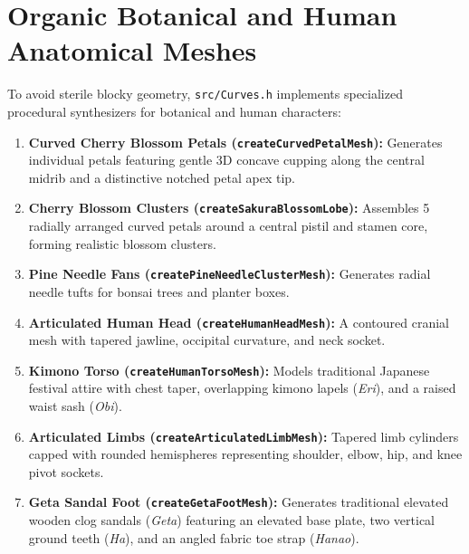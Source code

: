 \section{Organic Botanical and Human Anatomical Meshes}
To avoid sterile blocky geometry, \texttt{src/Curves.h} implements specialized procedural synthesizers for botanical and human characters:
\begin{enumerate}
    \item \textbf{Curved Cherry Blossom Petals (\texttt{createCurvedPetalMesh}):} Generates individual petals featuring gentle 3D concave cupping along the central midrib and a distinctive notched petal apex tip.
    \item \textbf{Cherry Blossom Clusters (\texttt{createSakuraBlossomLobe}):} Assembles 5 radially arranged curved petals around a central pistil and stamen core, forming realistic blossom clusters.
    \item \textbf{Pine Needle Fans (\texttt{createPineNeedleClusterMesh}):} Generates radial needle tufts for bonsai trees and planter boxes.
    \item \textbf{Articulated Human Head (\texttt{createHumanHeadMesh}):} A contoured cranial mesh with tapered jawline, occipital curvature, and neck socket.
    \item \textbf{Kimono Torso (\texttt{createHumanTorsoMesh}):} Models traditional Japanese festival attire with chest taper, overlapping kimono lapels (\textit{Eri}), and a raised waist sash (\textit{Obi}).
    \item \textbf{Articulated Limbs (\texttt{createArticulatedLimbMesh}):} Tapered limb cylinders capped with rounded hemispheres representing shoulder, elbow, hip, and knee pivot sockets.
    \item \textbf{Geta Sandal Foot (\texttt{createGetaFootMesh}):} Generates traditional elevated wooden clog sandals (\textit{Geta}) featuring an elevated base plate, two vertical ground teeth (\textit{Ha}), and an angled fabric toe strap (\textit{Hanao}).
\end{enumerate}

